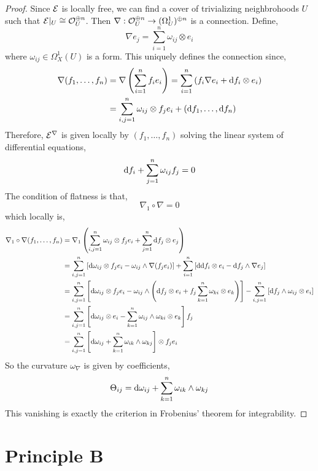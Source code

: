 \documentclass[12pt]{article}
\begin{document}
\begin{proof}
Since $\mathcal{E}$ is locally free, we can find a cover of trivializing neighbrohoods $U$ such that $\mathcal{E}|_U \cong \mathcal{O}_{U}^{\oplus n}$. Then $\nabla : \mathcal{O}_{U}^{\oplus n} \to (\Omega^1_U)^{\oplus n}$ is a connection. Define,
\[ \nabla e_j = \sum_{i = 1}^n \omega_{ij} \otimes e_i  \]
where $\omega_{ij} \in \Omega_X^1(U)$ is a form.
This uniquely defines the connection since,
\begin{align*}
\nabla (f_1, \dots, f_n) & = \nabla \left( \sum_{i = 1}^n f_i e_i \right) = \sum_{i = 1}^n \left( f_i \nabla e_i + \mathrm{d}{f_i} \otimes e_i \right)
\\
& = \sum_{i,j = 1}^n \omega_{ij} \otimes f_j e_i + (\mathrm{d}{f_1}, \dots, \mathrm{d}{f_n})
\end{align*}
Therefore, $\mathcal{E}^\nabla$ is given locally by $(f_1, \dots, f_n)$ solving the linear system of differential equations,
\[ \mathrm{d}{f_i} + \sum_{j = 1}^n \omega_{ij} f_j = 0 \]
The condition of flatness is that,
\[ \nabla_1 \circ \nabla = 0 \]
which locally is,
\begin{align*}
\nabla_1 \circ \nabla (f_1, \dots, f_n) & = \nabla_1 \left( \sum_{i,j = 1}^n \omega_{ij} \otimes f_j e_i + \sum_{j = 1}^n \mathrm{d}{f_j} \otimes e_j  \right) 
\\
& = \sum_{i,j = 1}^n \left[ \mathrm{d}{\omega_{ij}} \otimes f_j e_i - \omega_{ij} \wedge \nabla (f_j e_i) \right]  + \sum_{i = 1}^n \left[ \mathrm{d} \mathrm{d} f_i \otimes e_i - \mathrm{d}{f_j} \wedge \nabla e_j \right]
\\
& = \sum_{i,j = 1}^n \left[ \mathrm{d}{\omega_{ij}} \otimes f_j e_i - \omega_{ij} \wedge  \left(  \mathrm{d}{f_j} \otimes e_i  + f_j \sum_{k = 1}^n \omega_{ki} \otimes e_k \right) \right]  - \sum_{i,j = 1}^n \left[ \mathrm{d}{f_j} \wedge \omega_{ij} \otimes e_i  \right]
\\
& = \sum_{i,j = 1}^n  \left[ \mathrm{d}{\omega_{ij}} \otimes  e_i -  \sum_{k = 1}^n \omega_{ij} \wedge \omega_{ki} \otimes e_k \right] f_j
\\
& = \sum_{i,j = 1}^n \left[ \mathrm{d}{\omega_{ij}} + \sum_{k = 1}^n \omega_{ik} \wedge \omega_{kj} \right] \otimes f_j e_i
\end{align*}
So the curvature $\omega_\nabla$ is given by coefficients,
\[ \Theta_{ij} = \mathrm{d}{\omega_{ij}} + \sum_{k = 1}^n \omega_{ik} \wedge \omega_{kj} \]
This vanishing is exactly the criterion in Frobenius' theorem for integrability.
\end{proof}

\section{Principle B}
\end{document}
